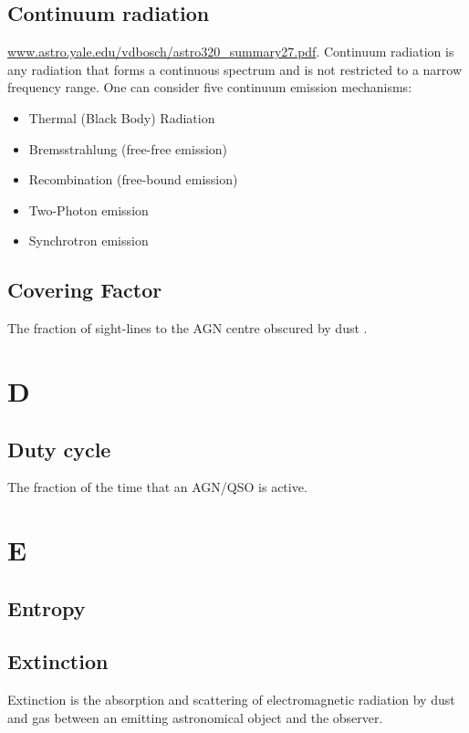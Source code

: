 \documentclass[11pt]{article}
\begin{document}
\subsection*{Continuum radiation}
\href{www.astro.yale.edu/vdbosch/astro320\_summary27.pdf}{www.astro.yale.edu/vdbosch/astro320\_summary27.pdf}.
Continuum radiation is any radiation that forms a continuous spectrum and is not restricted to a narrow frequency range. One can consider five continuum emission mechanisms:
\begin{itemize}
\item Thermal (Black Body) Radiation
\item Bremsstrahlung (free-free emission)
\item Recombination (free-bound emission) 
\item Two-Photon emission
\item Synchrotron emission
\end{itemize}


\subsection*{Covering Factor}
The fraction of sight-lines to the AGN centre obscured by dust
\citep[e.g.,][]{Roseboom2013}.

    

\section*{D}
    \subsection*{Duty cycle}
    The fraction of the time that an AGN/QSO is active.

\section*{E}
    \subsection*{Entropy}

    \subsection*{Extinction}
    Extinction is the absorption and scattering of electromagnetic
radiation by dust and gas between an emitting astronomical object and
the observer.
\end{document}
